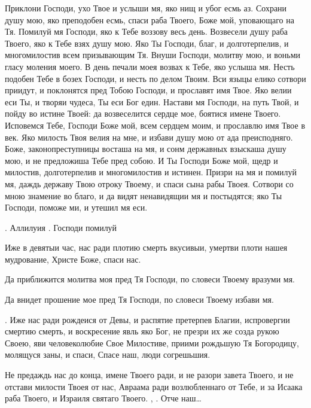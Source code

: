 \begin{mymulticols}
Приклони Господи, ухо Твое и услыши мя, яко нищ и убог есмь аз. Сохрани душу мою, яко преподобен есмь, спаси раба Твоего, Боже мой, уповающаго на Тя. Помилуй мя Господи, яко к Тебе воззову весь день. Возвесели душу раба Твоего, яко к Тебе взях душу мою. Яко Ты Господи, благ, и долготерпелив, и многомилостив всем призывающим Тя. Внуши Господи, молитву мою, и воньми гласу моления моего. В день печали моея возвах к Тебе, яко услыша мя. Несть подобен Тебе в бозех Господи, и несть по делом Твоим. Вси языцы елико сотвори приидут, и поклонятся пред Тобою Господи, и прославят имя Твое. Яко велии еси Ты, и творяи чудеса, Ты еси Бог един. Настави мя Господи, на путь Твой, и пойду во истине Твоей: да возвеселится сердце мое, боятися имене Твоего. Исповемся Тебе, Господи Боже мой, всем сердцем моим, и прославлю имя Твое в век. Яко милость Твоя велия на мне, и избави душу мою от ада преисподняго. Боже, законопреступницы восташа на мя, и сонм державных взыскаша душу мою, и не предложиша Тебе пред собою. И Ты Господи Боже мой, щедр и милостив, долготерпелив и многомилостив и истинен. Призри на мя и помилуй мя, даждь державу Твою отроку Твоему, и спаси сына рабы Твоея. Сотвори со мною знамение во благо, и да видят ненавидящии мя и постыдятся; яко Ты Господи, поможе ми, и утешил мя еси.

. Аллилуия . Господи помилуй 


 Иже в девятыи час, нас ради плотию смерть вкусивыи, умертви плоти нашея мудрование, Христе Боже, спаси нас.


 Да приближится молитва моя пред Тя Господи, по словеси Твоему вразуми мя.


 Да внидет прошение мое пред Тя Господи, по словеси Твоему избави мя.


. Иже нас ради рождеися от Девы, и распятие претерпев Благии, испровергии смертию смерть, и воскресение явль яко Бог, не презри их же созда рукою Своею, яви человеколюбие Свое Милостиве, приими рождьшую Тя Богородицу, молящуся заны, и спаси, Спасе наш, люди согрешьшия.


 Не предаждь нас до конца, имене Твоего ради, и не разори завета Твоего, и не отстави милости Твоея от нас, Авраама ради возлюбленнаго от Тебе, и за Исаака раба Твоего, и Израиля святаго Твоего. , .  Отче наш… 



\end{mymulticols}

